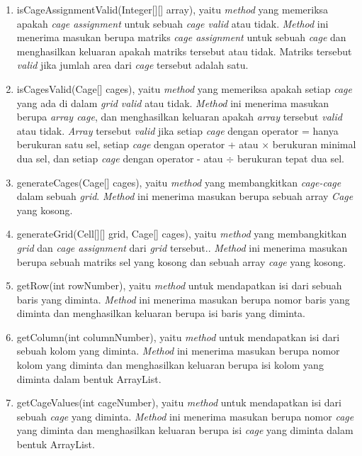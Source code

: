 \begin{enumerate}
\item isCageAssignmentValid(Integer[][] array), yaitu \textit{method} yang memeriksa apakah \textit{cage assignment} untuk sebuah \textit{cage valid} atau tidak. \textit{Method} ini menerima masukan berupa matriks \textit{cage assignment} untuk sebuah \textit{cage} dan menghasilkan keluaran apakah matriks tersebut atau tidak. Matriks tersebut \textit{valid} jika jumlah area dari \textit{cage} tersebut adalah satu.
\item isCagesValid(Cage[] cages), yaitu \textit{method} yang memeriksa apakah setiap \textit{cage} yang ada di dalam \textit{grid valid} atau tidak. \textit{Method} ini menerima masukan berupa \textit{array cage}, dan menghasilkan keluaran apakah \textit{array} tersebut \textit{valid} atau tidak. \textit{Array} tersebut \textit{valid} jika setiap \textit{cage} dengan operator = hanya berukuran satu sel, setiap \textit{cage} dengan operator + atau \begin{math}\times\end{math} berukuran minimal dua sel, dan setiap \textit{cage} dengan operator - atau \begin{math}\div\end{math} berukuran tepat dua sel.
\item generateCages(Cage[] cages), yaitu \textit{method} yang membangkitkan \textit{cage-cage} dalam sebuah \textit{grid}. \textit{Method} ini menerima masukan berupa sebuah array \textit{Cage} yang kosong.
\item generateGrid(Cell[][] grid, Cage[] cages), yaitu \textit{method} yang membangkitkan \textit{grid} dan \textit{cage assignment} dari \textit{grid} tersebut.. \textit{Method} ini menerima masukan berupa sebuah matriks sel yang kosong dan sebuah array \textit{cage} yang kosong.
\item getRow(int rowNumber), yaitu \textit{method} untuk mendapatkan isi dari sebuah baris yang diminta. \textit{Method} ini menerima masukan berupa nomor baris yang diminta dan menghasilkan keluaran berupa isi baris yang diminta.
\item getColumn(int columnNumber), yaitu \textit{method} untuk mendapatkan isi dari sebuah kolom yang diminta. \textit{Method} ini menerima masukan berupa nomor kolom yang diminta dan menghasilkan keluaran berupa isi kolom yang diminta dalam bentuk ArrayList.
\item getCageValues(int cageNumber), yaitu \textit{method} untuk mendapatkan isi dari sebuah \textit{cage} yang diminta. \textit{Method} ini menerima masukan berupa nomor \textit{cage} yang diminta dan menghasilkan keluaran berupa isi \textit{cage} yang diminta dalam bentuk ArrayList.

\end{enumerate}
